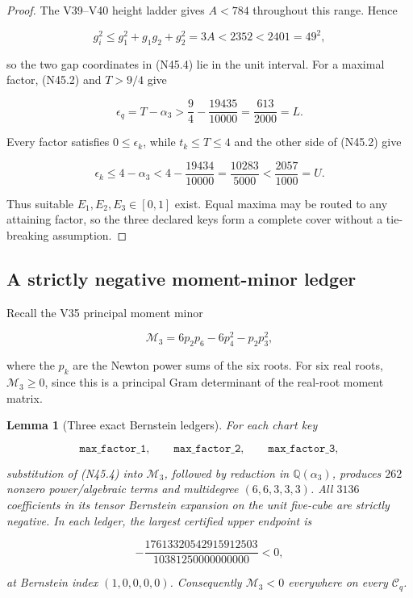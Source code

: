 \documentclass[11pt]{article}
\newtheorem{lemma}[theorem]{Lemma}
\theoremstyle{definition}
\theoremstyle{remark}
\begin{document}
\begin{proof}
The V39--V40 height ladder gives \(A<784\) throughout this range.  Hence

\[
 g_i^2\leq g_1^2+g_1g_2+g_2^2=3A
 <2352<2401=49^2,
\tag{N45.5}
\]

so the two gap coordinates in \textup{(N45.4)} lie in the unit interval.
For a maximal factor, \textup{(N45.2)} and \(T>9/4\) give

\[
 \epsilon_q=T-\alpha_3
 >\frac94-\frac{19435}{10000}
 =\frac{613}{2000}=L.
\tag{N45.6}
\]

Every factor satisfies \(0\leq\epsilon_k\), while \(t_k\leq T\leq4\)
and the other side of \textup{(N45.2)} give

\[
 \epsilon_k\leq4-\alpha_3
 <4-\frac{19434}{10000}
 =\frac{10283}{5000}
 <\frac{2057}{1000}=U.
\tag{N45.7}
\]

Thus suitable \(E_1,E_2,E_3\in[0,1]\) exist.  Equal maxima may be routed
to any attaining factor, so the three declared keys form a complete
cover without a tie-breaking assumption.
\end{proof}

\subsection{A strictly negative moment-minor ledger}

Recall the V35 principal moment minor

\[
 \mathcal M_3
 =6p_2p_6-6p_4^2-p_2p_3^2,
\tag{N45.8}
\]

where the \(p_k\) are the Newton power sums of the six roots.  For six
real roots, \(\mathcal M_3\geq0\), since this is a principal Gram
determinant of the real-root moment matrix.

\begin{lemma}[Three exact Bernstein ledgers]
\label{lem:f2v45-ledgers}
For each chart key

\[
 \texttt{max\_factor\_1},\qquad
 \texttt{max\_factor\_2},\qquad
 \texttt{max\_factor\_3},
\tag{N45.9}
\]

substitution of \textup{(N45.4)} into \(\mathcal M_3\), followed by
reduction in \(\mathbb Q(\alpha_3)\), produces \(262\) nonzero
power/algebraic terms and multidegree
\((6,6,3,3,3)\).  All \(3136\) coefficients in its tensor Bernstein
expansion on the unit five-cube are strictly negative.  In each ledger,
the largest certified upper endpoint is

\[
 -\frac{17613320542915912503}{10381250000000000}<0,
\tag{N45.10}
\]

at Bernstein index \((1,0,0,0,0)\).  Consequently
\(\mathcal M_3<0\) everywhere on every \(\mathcal C_q\).
\end{lemma}
\end{document}
